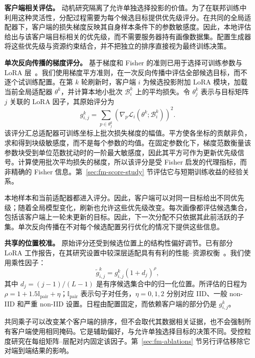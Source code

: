 \noindent\textbf{客户端相关评估。}
动机研究隔离了允许单独选择投影的价值。为了在联邦训练中利用这种灵活性，分配过程需要为每个候选目标提供优先级评分。在共同的全局适配器下，客户端的损失梯度反映其自身样本条件下的参数敏感度。因此，本地评估给出与该客户端目标相关的优先级，而不需要服务器持有画像数据集。配置生成器将这些优先级与资源约束结合，并不把独立的排序直接视为最终训练决策。

\noindent\textbf{单次反向传播的梯度评分。}
基于梯度和 Fisher 的准则已用于选择可训练参数与 LoRA 层~\cite{fm_fish2021,zhang2025fedhello}。我们使用梯度平方准则，在一次反向传播中评估全部候选目标，而不逐个试训练配置。在第 $k$ 轮刷新时，客户端 $i$ 为候选投影附加 LoRA 模块，加载当前全局适配器 $\theta^k$，并计算本地小批次 $\mathcal B_i^k$ 上的平均损失。令 $\theta_j^k$ 表示与目标矩阵 $j$ 关联的 LoRA 因子，其原始评分为
\begin{equation}
 g_{i,j}^k=\sum_{p\in\theta_j^k}
 \left(\nabla_p\mathcal L_i(\theta^k;\mathcal B_i^k)\right)^2.
 \label{eq:fim}
\end{equation}
该评分汇总适配器可训练坐标上批次损失梯度的幅值。平方使各坐标的贡献非负，求和得到块级敏感度，而不是每个参数的均值。在固定参数化下，梯度范数衡量该参数块受到单位范数扰动时的一阶最大敏感度，因此其平方可作为更新优先级信号。计算使用批次平均损失的梯度，所以该评分是受 Fisher 启发的代理指标，而非精确的 Fisher 信息。第~\ref{sec:fm-score-study} 节评估它与短期训练收益的经验关系。

本地样本和当前适配器都进入评分。因此，客户端可以对同一目标给出不同优先级；随着全局模型变化，刷新也允许这些优先级改变。每次画像都评估候选集合，包括该客户端上一轮未更新的目标。因此，下一次分配不只依据其此前活跃的子集。单次反向传播在不对每个候选配置另行优化的情况下提供这些信息。

\noindent\textbf{共享的位置校准。}
原始评分还受到候选位置上的结构性偏好调节。已有部分 LoRA 工作报告，在其研究设置中较深层适配具有有利的性能--资源权衡~\cite{liu2025legend}。我们使用乘性因子：
\begin{equation}
 \widetilde g_{i,j}^k=g_{i,j}^k(1+d_j)^{\rho},
 \label{eq:depth}
\end{equation}
其中 $d_j=(j-1)/(L-1)$ 是有序候选集合中的归一化位置。所评估的日程为 $\rho=1+1.5\mathbb I_{\mathrm{pair}}+\eta$；$\mathbb I_{\mathrm{pair}}$ 表示句子对任务，$\eta=0,1,2$ 分别对应 IID、一般 non-IID 和严重 non-IID 设置。日程由配置固定，而依赖客户端的部分仍是 $g_{i,j}^k$。

共同乘子可以改变某个客户端的排序，但不会取代其数据相关证据，也不会强制所有客户端使用相同掩码。它是辅助偏好，与允许单独选择目标的决策不同。受控粒度研究在每组矩阵--层配对内固定该因子。第~\ref{sec:fm-ablations} 节另行评估移除它对端到端结果的影响。

